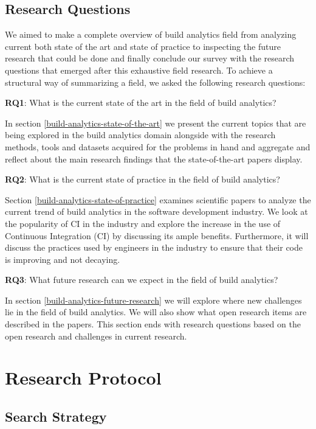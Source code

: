 \documentclass[]{book}
\begin{document}
\subsection{Research Questions}\label{research-questions}

We aimed to make a complete overview of build analytics field from
analyzing current both state of the art and state of practice to
inspecting the future research that could be done and finally conclude
our survey with the research questions that emerged after this
exhaustive field research. To achieve a structural way of summarizing a
field, we asked the following research questions:

\textbf{RQ1}: What is the current state of the art in the field of build
analytics?

In section \ref{build-analytics-state-of-the-art} we present the current
topics that are being explored in the build analytics domain alongside
with the research methods, tools and datasets acquired for the problems
in hand and aggregate and reflect about the main research findings that
the state-of-the-art papers display.

\textbf{RQ2}: What is the current state of practice in the field of
build analytics?

Section \ref{build-analytics-state-of-practice} examines scientific
papers to analyze the current trend of build analytics in the software
development industry. We look at the popularity of CI in the industry
and explore the increase in the use of Continuous Integration (CI) by
discussing its ample benefits. Furthermore, it will discuss the
practices used by engineers in the industry to ensure that their code is
improving and not decaying.

\textbf{RQ3}: What future research can we expect in the field of build
analytics?

In section \ref{build-analytics-future-research} we will explore where
new challenges lie in the field of build analytics. We will also show
what open research items are described in the papers. This section ends
with research questions based on the open research and challenges in
current research.

\section{Research Protocol}\label{build-analytics-research-protocol}

\subsection{Search Strategy}\label{search-strategy}
\end{document}
